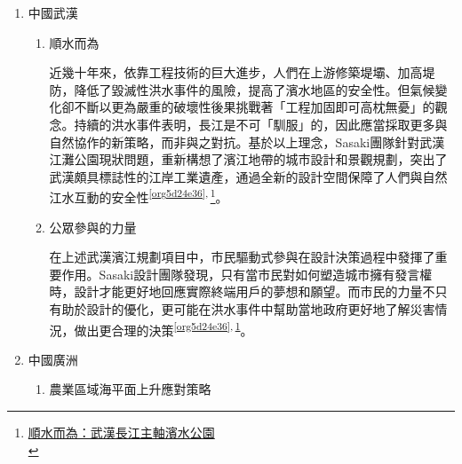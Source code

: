 \documentclass[a4paper,12pt]{article}
\begin{document}
\begin{enumerate}
\item 中國武漢
\label{sec:orgd82dbc0}

\begin{enumerate}
\item 順水而為
\label{sec:org2e4f75c}

近幾十年來，依靠工程技術的巨大進步，人們在上游修築堤壩、加高堤防，降低了毀滅性洪水事件的風險，提高了濱水地區的安全性。但氣候變化卻不斷以更為嚴重的破壞性後果挑戰著「工程加固即可高枕無憂」的觀念。持續的洪水事件表明，長江是不可「馴服」的，因此應當採取更多與自然協作的新策略，而非與之對抗。基於以上理念，Sasaki團隊針對武漢江灘公園現狀問題，重新構想了濱江地帶的城市設計和景觀規劃，突出了武漢頗具標誌性的江岸工業遺產，通過全新的設計空間保障了人們與自然江水互動的安全性\textsuperscript{\ref{org5d24e36}}\textsuperscript{,}\,\footnote{\href{https://a.design/index.php?m=doc\&a=doc\_show\&id=528E3CD63464219F5E1BD8}{順水而為：武漢長江主軸濱水公園}\\\label{org9bb1fe0}}。\\
\item 公眾參與的力量
\label{sec:orgff91fd1}

在上述武漢濱江規劃項目中，市民驅動式參與在設計決策過程中發揮了重要作用。Sasaki設計團隊發現，只有當市民對如何塑造城市擁有發言權時，設計才能更好地回應實際終端用戶的夢想和願望。而市民的力量不只有助於設計的優化，更可能在洪水事件中幫助當地政府更好地了解災害情況，做出更合理的決策\textsuperscript{\ref{org5d24e36}}\textsuperscript{,}\,\textsuperscript{\ref{org9bb1fe0}}。\\
\end{enumerate}

\item 中國廣洲
\label{sec:orgee3125b}

\begin{enumerate}
\item 農業區域海平面上升應對策略
\label{sec:org6f2483d}


\end{enumerate}
\end{enumerate}
\end{document}
